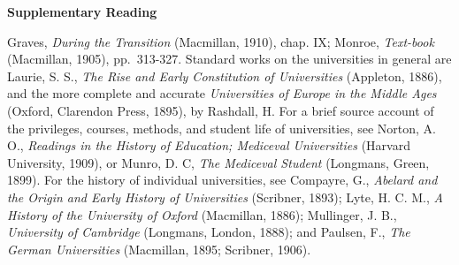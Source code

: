 \documentclass[]{book}
\begin{document}
\textbf{Supplementary Reading}

Graves, \emph{During the Transition} (Macmillan, 1910), chap. IX; Monroe, \emph{Text-book} (Macmillan, 1905), pp.~313-327. Standard works on the universities in general are Laurie, S. S., \emph{The Rise and Early Constitution of Universities} (Appleton, 1886), and the more complete and accurate \emph{Universities of Europe in the Middle Ages} (Oxford, Clarendon Press, 1895), by Rashdall, H. For a brief source account of the privileges, courses, methods, and student life of universities, see Norton, A. O., \emph{Readings in the History of Education; Mediceval Universities} (Harvard University, 1909), or Munro, D. C, \emph{The Mediceval Student} (Longmans, Green, 1899). For the history of individual universities, see Compayre, G.,\protect\hypertarget{ch9.xmlux5cux23para.125.1.0.box.327.250.1048.219.q.50}{}{ \emph{Abelard and the Origin and Early History of Universities} (Scribner, 1893); Lyte, H. C. M., \emph{A History of the University of Oxford} (Macmillan, 1886); Mullinger, J. B., \emph{University of Cambridge} (Longmans, London, 1888); and Paulsen, F., \emph{The German Universities} (Macmillan, 1895; Scribner, 1906).}


\end{document}
